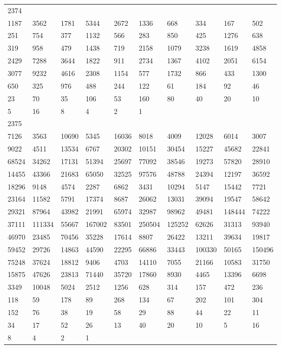 \begin{longtable}{*{10}{l}}
2374&&&&&&&&&\\
1187& 3562& 1781& 5344& 2672& 1336& 668& 334& 167& 502\\
251& 754& 377& 1132& 566& 283& 850& 425& 1276& 638\\
319& 958& 479& 1438& 719& 2158& 1079& 3238& 1619& 4858\\
2429& 7288& 3644& 1822& 911& 2734& 1367& 4102& 2051& 6154\\
3077& 9232& 4616& 2308& 1154& 577& 1732& 866& 433& 1300\\
650& 325& 976& 488& 244& 122& 61& 184& 92& 46\\
23& 70& 35& 106& 53& 160& 80& 40& 20& 10\\
5& 16& 8& 4& 2& 1& \\

2375&&&&&&&&&\\
7126& 3563& 10690& 5345& 16036& 8018& 4009& 12028& 6014& 3007\\
9022& 4511& 13534& 6767& 20302& 10151& 30454& 15227& 45682& 22841\\
68524& 34262& 17131& 51394& 25697& 77092& 38546& 19273& 57820& 28910\\
14455& 43366& 21683& 65050& 32525& 97576& 48788& 24394& 12197& 36592\\
18296& 9148& 4574& 2287& 6862& 3431& 10294& 5147& 15442& 7721\\
23164& 11582& 5791& 17374& 8687& 26062& 13031& 39094& 19547& 58642\\
29321& 87964& 43982& 21991& 65974& 32987& 98962& 49481& 148444& 74222\\
37111& 111334& 55667& 167002& 83501& 250504& 125252& 62626& 31313& 93940\\
46970& 23485& 70456& 35228& 17614& 8807& 26422& 13211& 39634& 19817\\
59452& 29726& 14863& 44590& 22295& 66886& 33443& 100330& 50165& 150496\\
75248& 37624& 18812& 9406& 4703& 14110& 7055& 21166& 10583& 31750\\
15875& 47626& 23813& 71440& 35720& 17860& 8930& 4465& 13396& 6698\\
3349& 10048& 5024& 2512& 1256& 628& 314& 157& 472& 236\\
118& 59& 178& 89& 268& 134& 67& 202& 101& 304\\
152& 76& 38& 19& 58& 29& 88& 44& 22& 11\\
34& 17& 52& 26& 13& 40& 20& 10& 5& 16\\
8& 4& 2& 1& \\


\end{longtable}
